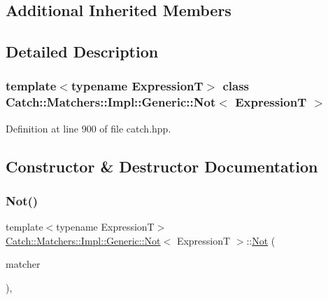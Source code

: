 \subsection*{Additional Inherited Members}


\subsection{Detailed Description}
\subsubsection*{template$<$typename ExpressionT$>$\newline
class Catch\+::\+Matchers\+::\+Impl\+::\+Generic\+::\+Not$<$ Expression\+T $>$}



Definition at line 900 of file catch.\+hpp.



\subsection{Constructor \& Destructor Documentation}
\hypertarget{class_catch_1_1_matchers_1_1_impl_1_1_generic_1_1_not_a9b99e3ce49c1a16931708b67c312f204}{}\label{class_catch_1_1_matchers_1_1_impl_1_1_generic_1_1_not_a9b99e3ce49c1a16931708b67c312f204} 
\subsubsection{\texorpdfstring{Not()}{Not()}\hspace{0.1cm}{\footnotesize\ttfamily [1/2]}}
{\footnotesize\ttfamily template$<$typename ExpressionT$>$ \\
\hyperlink{class_catch_1_1_matchers_1_1_impl_1_1_generic_1_1_not}{Catch\+::\+Matchers\+::\+Impl\+::\+Generic\+::\+Not}$<$ ExpressionT $>$\+::\hyperlink{class_catch_1_1_matchers_1_1_impl_1_1_generic_1_1_not}{Not} (\begin{DoxyParamCaption}\item[{\hyperlink{struct_catch_1_1_matchers_1_1_impl_1_1_matcher}{Matcher}$<$ ExpressionT $>$ const \&}]{matcher }\end{DoxyParamCaption})\hspace{0.3cm}{\ttfamily [inline]}, {\ttfamily [explicit]}}



